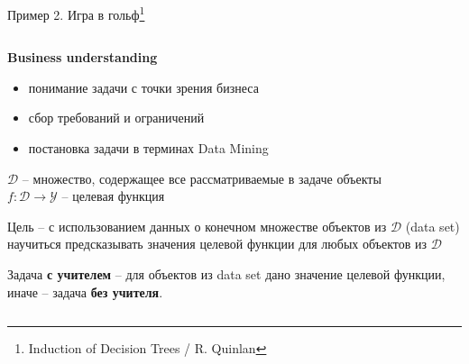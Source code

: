 \documentclass[aspectratio=169]{beamer}
\begin{document}
\begin{frame}{Пример 2. Игра в гольф\footnote{Induction of Decision Trees / R. Quinlan\vspace{1.5em}}}

\begin{columns}
    \begin{column}{.7\textwidth}
    \begin{small}
    	{\bf Business understanding}
		\begin{itemize}
		\item понимание задачи с точки зрения бизнеса
		\item сбор требований и ограничений
		\item постановка задачи в терминах Data Mining
		\end{itemize}
		
		$\mathcal{D}$ -- множество, содержащее все рассматриваемые в задаче объекты \\  \vspace{1em}
		$f: \mathcal{D} \rightarrow \mathcal{Y}$ -- целевая функция \\ \vspace{1em}
		
		Цель -- с использованием данных о конечном множестве объектов из $\mathcal{D}$ (data set) научиться предсказывать значения целевой функции для любых объектов из $\mathcal{D}$
		
		\vspace{1em}
		Задача {\bf с учителем} -- для объектов из data set дано значение целевой функции, иначе -- задача {\bf без учителя}.	
				\end{small}
		

\end{column}
\end{columns}
\end{frame}
\end{document}
